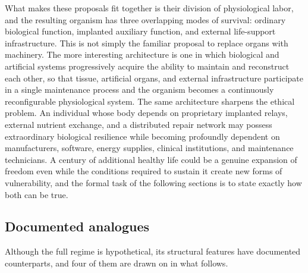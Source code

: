 \documentclass[11pt]{article}
\theoremstyle{plain}
\theoremstyle{definition}
\theoremstyle{remark}
\begin{document}
What makes these proposals fit together is their division of physiological labor, and the resulting organism has three overlapping modes of survival: ordinary biological function, implanted auxiliary function, and external life-support infrastructure. This is not simply the familiar proposal to replace organs with machinery. The more interesting architecture is one in which biological and artificial systems progressively acquire the ability to maintain and reconstruct each other, so that tissue, artificial organs, and external infrastructure participate in a single maintenance process and the organism becomes a continuously reconfigurable physiological system. The same architecture sharpens the ethical problem. An individual whose body depends on proprietary implanted relays, external nutrient exchange, and a distributed repair network may possess extraordinary biological resilience while becoming profoundly dependent on manufacturers, software, energy supplies, clinical institutions, and maintenance technicians. A century of additional healthy life could be a genuine expansion of freedom even while the conditions required to sustain it create new forms of vulnerability, and the formal task of the following sections is to state exactly how both can be true.

\subsection{Documented analogues}

Although the full regime is hypothetical, its structural features have documented counterparts, and four of them are drawn on in what follows.
\end{document}
